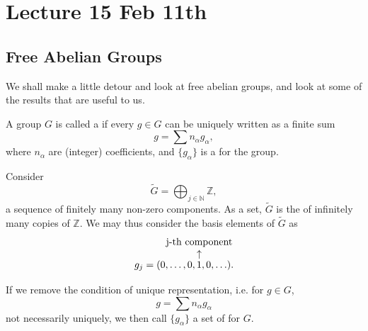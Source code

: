 \documentclass[notoc,notitlepage]{tufte-book}
\begin{document}
\begin{eg}\label{eg:homology_of_the_klein_bottle}
\end{eg}



\chapter{Lecture 15 Feb 11th}%
\label{chp:lecture_15_feb_11th}

\section{Free Abelian Groups}%
\label{sec:free_abelian_groups}

We shall make a little detour and look at free abelian groups, and look at some
of the results that are useful to us.

\begin{defn}\label{defn:free_abelian_groups}
  A group $G$ is called a  if every $g \in G$ can be
  uniquely written as a finite sum
  \begin{equation*}
    g = \sum n_\alpha g_\alpha,
  \end{equation*}
  where $n_\alpha$ are (integer) coefficients, and $\{ g_\alpha \}$ is a
   for the group.
\end{defn}

\begin{eg}
  Consider
  \begin{equation*}
    \tilde{G} = \bigoplus_{j \in \mathbb{N}} \mathbb{Z},
  \end{equation*}
  a sequence of finitely many non-zero components. As a set, $\tilde{G}$ is the
   of infinitely many copies of
  $\mathbb{Z}$. We may thus consider the basis elements of $\tilde{G}$ as
  \begin{equation*}
    g_j = (0, \ldots, 0, \overarrow{1}{j-\text{th component}}, 0, \ldots).
  \end{equation*}
\end{eg}

\begin{defn}\label{defn:generators_of_a_group}
  If we remove the condition of unique representation, i.e. for $g \in G$,
  \begin{equation*}
    g = \sum n_\alpha g_\alpha
  \end{equation*}
  not necessarily uniquely, we then call $\{ g_\alpha \}$ a set of
   for $G$.
\end{defn}
\end{document}
